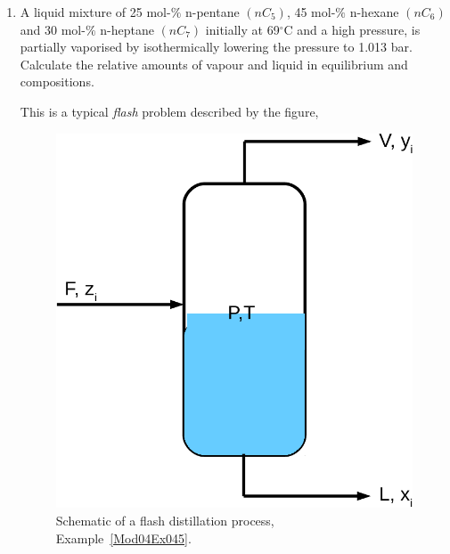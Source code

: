 \documentclass[12pts,a4paper,amsmath,amssymb,floatfix]{article}%
\begin{document}
\begin{enumerate}[1)]
\clearpage
   \item\label{Mod04Ex045} A liquid mixture of 25 mol-$\%$ n-pentane $\left(nC_{5}\right)$, 45 mol-$\%$ n-hexane $\left(nC_{6}\right)$ and 30 mol-$\%$ n-heptane $\left(nC_{7}\right)$ initially at 69$^{\circ}$C and a high pressure, is partially vaporised by isothermically lowering the pressure to  1.013 bar. Calculate the relative amounts of vapour and liquid in equilibrium and compositions.

  This is a typical {\it flash} problem described by the figure,
    
  \begin{figure}[h]
     \begin{center}
         \includegraphics[width=.25\linewidth,clip]{./Figs/FlashDistillation}
     \end{center}
     \caption{Schematic of a flash distillation process, Example~\ref{Mod04Ex045}.}
  \end{figure}


\end{enumerate}
\end{document}
